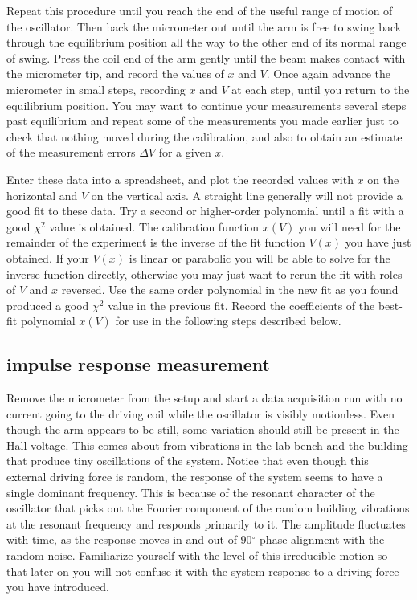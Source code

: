 \documentclass{revtex4}
\begin{document}
Repeat this procedure until you reach the end of the useful range of motion
of the oscillator.  Then back the micrometer out until the arm is free to
swing back through the equilibrium position all the way to the other end of
its normal range of swing.  Press the coil end of the arm gently until the
beam makes contact with the micrometer tip, and record the values of $x$
and $V$.  Once again advance the micrometer in small steps, recording $x$
and $V$ at each step, until you return to the equilibrium position.  You
may want to continue your measurements several steps past equilibrium and
repeat some of the measurements you made earlier just to check that nothing
moved during the calibration, and also to obtain an estimate of the 
measurement errors $\Delta V$ for a given $x$.

Enter these data into a
spreadsheet, and plot the recorded values with $x$ on the horizontal and
$V$ on the vertical axis.  A straight line generally will not provide a good
fit to these data.  Try a second or higher-order polynomial until a fit with
a good $\chi^2$ value is obtained.  The calibration function $x(V)$ you will
need for the remainder of the experiment is the inverse of the fit function
$V(x)$ you have just obtained.  If your $V(x)$ is linear or parabolic you
will be able to solve for the inverse function directly, otherwise you may
just want to rerun the fit with roles of $V$ and $x$ reversed.  Use the
same order polynomial in the new fit as you found produced a good $\chi^2$
value in the previous fit.  Record the coefficients of the best-fit
polynomial $x(V)$ for use in the following steps described below.

\subsection{impulse response measurement}

Remove the micrometer from the setup and start a data acquisition run
with no current going to the driving coil while the oscillator is visibly
motionless.  Even though the arm appears to be still, some variation should
still be present in the Hall voltage.  This comes about from vibrations in
the lab bench and the building that produce tiny oscillations of the system.
Notice that even though this external driving force is random, the response
of the system seems to have a single dominant frequency.  This is because of
the resonant character of the oscillator that picks out the Fourier component
of the random building vibrations at the resonant frequency and responds
primarily to it.  The amplitude fluctuates with time, as the response moves
in and out of 90$^{\circ}$ phase alignment with the random noise.  Familiarize
yourself with the level of this irreducible motion so that later on you will
not confuse it with the system response to a driving force you have introduced.
\end{document}
